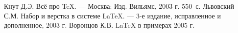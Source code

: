 \documentclass[12pt,a4paper]{scrartcl}
\begin{document}
\begin{thebibliography}{9}
Кнут Д.Э. Всё про \TeX. \newblock --- Москва: Изд. Вильямс, 2003 г. 550~с.
Львовский С.М. Набор и верстка в системе \LaTeX{}. \newblock --- 3-е издание, исправленное и дополненное, 2003 г.
Воронцов К.В. \LaTeX{} в примерах 2005 г.
\end{thebibliography}
\end{document}
